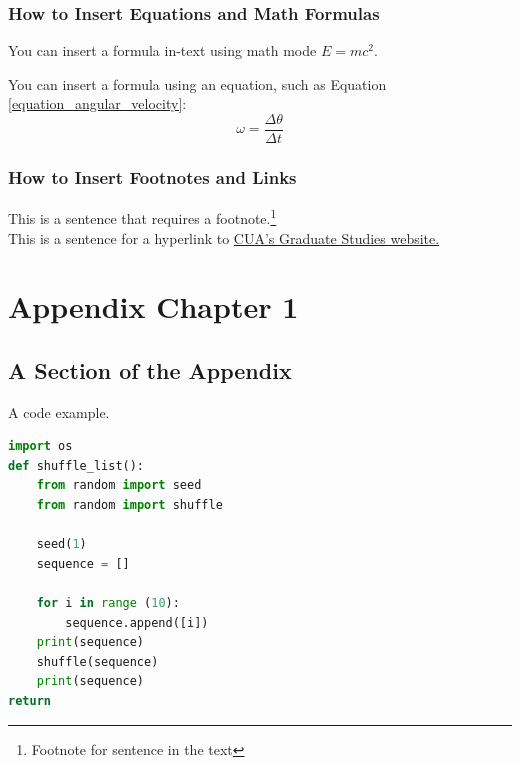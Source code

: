 \documentclass[12pt]{report}
\begin{document}
\subsection{How to Insert Equations and Math Formulas}
You can insert a formula in-text using math mode $E = mc^{2}$. 

You can insert a formula using an equation, such as Equation \ref{equation_angular_velocity}:
\begin{equation} \label{equation_angular_velocity}
	\omega = \frac{\Delta \theta}{\Delta t}
\end{equation}


\subsection{How to Insert Footnotes and Links}
This is a sentence that requires a footnote.\footnote[1]{Footnote for sentence in the text}\\
This is a sentence for a hyperlink to \href{https://graduate-studies.catholic.edu/}{CUA's Graduate Studies website.}



\newpage
\singlespacing
\pagestyle{fancy}
\fancyhf{}
\fancyfoot[C]{\thepage}
\printbibliography 
\newpage
\appendix
\chapter{Appendix Chapter 1} \label{appendix}
\section{A Section of the Appendix}
A code example. 
\begin{lstlisting}[language=Python]
import os
def shuffle_list():
	from random import seed
	from random import shuffle 
	
	seed(1)
	sequence = []
	
	for i in range (10):
		sequence.append([i])
	print(sequence)
	shuffle(sequence)
	print(sequence)
return 
\end{lstlisting}
\end{document}
